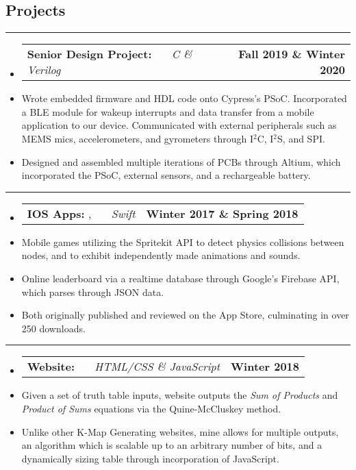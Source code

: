 \documentclass[10pt,letterpaper]{article}
\makeatletter
\newcommand{\items}[2]
{
	\begin{tabular*}{\linewidth}{l @{\extracolsep{\fill}} r}
		#1 & #2 \\
	\end{tabular*}
}
\newcommand{\sectionbreak}
{
	\vspace{-1.2em}
	\rule{\textwidth}{1.7pt}
	\vspace{-1.7em}
}
\makeatother
\begin{document}
\vspace{-1.5em}

\subsection*{Projects}
\sectionbreak


\begin{itemize}
	\item[]
		\items 
		{
			\textbf{Senior Design Project: }
			\emph{\smash{Smart Dog Collar}} \ \ \ \footnotesize \emph{C \& Verilog}
		}
			{\textbf{Fall 2019 \& Winter 2020}}
		\item 
			Wrote embedded firmware and HDL code onto Cypress's PSoC. Incorporated a BLE module for wakeup interrupts and data transfer from a mobile application to our device. Communicated with external peripherals such as MEMS mics, accelerometers, and gyrometers through I$^{2}$C, I$^{2}$S, and SPI. 
		\item 
			Designed and assembled multiple iterations of PCBs through Altium, which incorporated the PSoC, external sensors, and a rechargeable battery.

\end{itemize}

\hrule

\begin{itemize}
	\item[]
		\items 
		{
			\textbf{IOS Apps: }
			\href{https://appadvice.com/app/round-bound/1369632746}{\emph{\underline{\smash{Round 'a Bound}}}}, 
			\href{https://appadvice.com/app/tic-tac-emoji/1346934986}{\emph{\underline{\smash{Tic-Tac Emoji}}}} \ \ \ \footnotesize  \emph{Swift}
		}
			{\textbf{Winter 2017 \& Spring 2018}}
		\item 
			Mobile games utilizing the Spritekit API to detect physics collisions between nodes, and to exhibit independently made animations and sounds.
		\item
			Online leaderboard via a realtime database through Google's Firebase API, which parses through JSON data. 
		\item
			Both originally published and reviewed on the App Store, culminating in over 250 downloads.
\end{itemize}

\hrule

\begin{itemize}
	\item[]
		\items
			{	
				\textbf{Website: }
				\href{https://aashpointo.github.io/KmapWebsite/}{\emph{\underline{\smash{aashpointo.github.io/KmapWebsite}}}} \ \ \ \footnotesize \emph{HTML/CSS \& JavaScript}
				}
				{\textbf{Winter 2018}}
		\item
			Given a set of truth table inputs, website outputs the \emph{Sum of Products} and \emph{Product of Sums} equations via the  Quine-McCluskey method. 
		\item 
			Unlike other K-Map Generating websites, mine allows for multiple outputs, an algorithm which is scalable up to an arbitrary number of bits, and a dynamically sizing table through incorporation of JavaScript.

\end{itemize}
\end{document}
